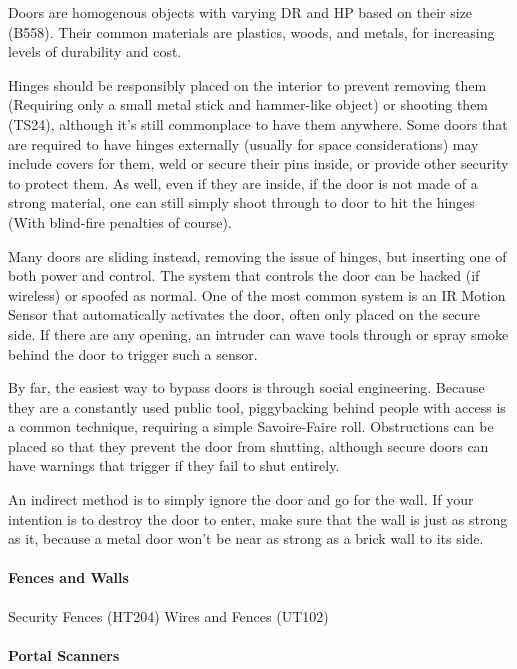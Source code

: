 \begin{multicols}{2}
	Doors are homogenous objects with varying DR and HP based on their size (B558). Their common materials are plastics, woods, and metals, for increasing levels of durability and cost. 
	
	Hinges should be responsibly placed on the interior to prevent removing them (Requiring only a small metal stick and hammer-like object) or shooting them (TS24), although it's still commonplace to have them anywhere. Some doors that are required to have hinges externally (usually for space considerations) may include covers for them, weld or secure their pins inside, or provide other security to protect them. As well, even if they are inside, if the door is not made of a strong material, one can still simply shoot through to door to hit the hinges (With blind-fire penalties of course).
	
	Many doors are sliding instead, removing the issue of hinges, but inserting one of both power and control. The system that controls the door can be hacked (if wireless) or spoofed as normal. One of the most common system is an IR Motion Sensor that automatically activates the door, often only placed on the secure side. If there are any opening, an intruder can wave tools through or spray smoke behind the door to trigger such a sensor. 
	
	By far, the easiest way to bypass doors is through social engineering. Because they are a constantly used public tool, piggybacking behind people with access is a common technique, requiring a simple Savoire-Faire roll. Obstructions can be placed so that they prevent the door from shutting, although secure doors can have warnings that trigger if they fail to shut entirely.
	
	An indirect method is to simply ignore the door and go for the wall. If your intention is to destroy the door to enter, make sure that the wall is just as strong as it, because a metal door won't be near as strong as a brick wall to its side.
	
	\paragraph{Fences and Walls}
	
	Security Fences (HT204)
	Wires and Fences (UT102)
	
	\paragraph{Portal Scanners}
	

\end{multicols}
